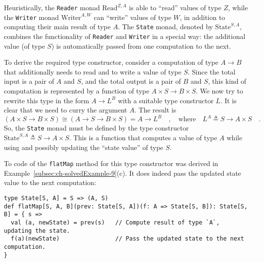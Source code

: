 Heuristically, the \lstinline!Reader! monad $\text{Read}^{Z,A}$
is able to \textsf{``}read\textsf{''} values of type $Z$, while the \lstinline!Writer!
monad $\text{Writer}^{A,W}$ can \textsf{``}write\textsf{''} values of type $W$,
in addition to computing their main result of type $A$. The \lstinline!State!
monad, denoted by $\text{State}^{S,A}$, combines the functionality
of \lstinline!Reader! and \lstinline!Writer! in a special way: the
additional value (of type $S$) is automatically passed from one computation
to the next. 

To derive the required type constructor, consider a computation of
type $A\rightarrow B$ that additionally needs to read and to write
a value of type $S$. Since the total input is a pair of $A$ and
$S$, and the total output is a pair of $B$ and $S$, this kind of
computation is represented by a function of type $A\times S\rightarrow B\times S$.
We now try to rewrite this type in the form $A\rightarrow L^{B}$
with a suitable type constructor $L$. It is clear that we need to
curry the argument $A$. The result is 
\[
\left(A\times S\rightarrow B\times S\right)\cong\left(A\rightarrow S\rightarrow B\times S\right)=A\rightarrow L^{B}\quad,\quad\text{where}\quad L^{A}\triangleq S\rightarrow A\times S\quad.
\]
So, the \lstinline!State!
monad must be defined by the type constructor $\text{State}^{S,A}\triangleq S\rightarrow A\times S$.
This is a function that computes a value of type $A$ while using
and possibly updating the \textsf{``}state value\textsf{''} of type $S$.

To code of the \lstinline!flatMap! method for this type constructor
was derived in Example~\ref{subsec:ch-solvedExample-9}(c). It does
indeed pass the updated state value to the next computation:
\begin{lstlisting}
type State[S, A] = S => (A, S)
def flatMap[S, A, B](prev: State[S, A])(f: A => State[S, B]): State[S, B] = { s =>
  val (a, newState) = prev(s)   // Compute result of type `A`, updating the state.
  f(a)(newState)                // Pass the updated state to the next computation.
}
\end{lstlisting}


